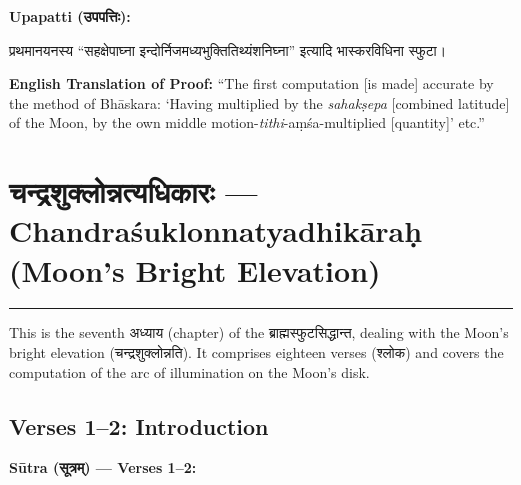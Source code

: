 \documentclass[11pt,a4paper]{article}
\newcommand{\dev}[1]{{\devanagarifont #1}}
\newenvironment{sanskritverse}{%
  \begin{center}\begin{minipage}{0.95\textwidth}
  \setlength{\leftskip}{1em}
  \setlength{\rightskip}{1em}
  \dev
}{\end{minipage}\end{center}}
\newenvironment{paracol}[1]{\begingroup}{\endgroup}
\newcommand{\switchcolumn}[1][]{%
  \ifnum#1=0\relax\else\par\nobreak\vspace{0.5em}\par\nobreak\fi%
}
\begin{document}
\vspace{0.5em}

\begin{paracol}{2}

\noindent\textbf{Upapatti (\dev{उपपत्तिः}):}
\begin{sanskritverse}
प्रथमानयनस्य ``सहक्षेपाघ्ना इन्दोर्निजमध्यभुक्तितिथ्यंशनिघ्ना'' इत्यादि
भास्करविधिना स्फुटा।
\end{sanskritverse}

\switchcolumn

\textbf{English Translation of Proof:} ``The first computation [is made] accurate by the method of Bhāskara: `Having multiplied by the \textit{sahakṣepa} [combined latitude] of the Moon, by the own middle motion-\textit{tithi}-aṃśa-multiplied [quantity]' etc.''

\end{paracol}

\newpage

\section{\texorpdfstring{{\devanagarifont चन्द्रशुक्लोन्नत्यधिकारः} — Chandraśuklonnatyadhikāraḥ (Moon's Bright Elevation)}{Chandraśuklonnatyadhikāraḥ (Moon's Bright Elevation)}}
\label{sec:chandra-shuklonnati}

\begin{center}
\textcolor{rulecolor}{\rule{0.8\textwidth}{0.5pt}}
\end{center}

This is the seventh \dev{अध्याय} (chapter) of the \dev{ब्राह्मस्फुटसिद्धान्त}, dealing with the Moon's bright elevation (\dev{चन्द्रशुक्लोन्नति}). It comprises eighteen verses (\dev{श्लोक}) and covers the computation of the arc of illumination on the Moon's disk.

\subsection{Verses 1--2: Introduction}

\vspace{0.5em}
\noindent\textbf{Sūtra (\dev{सूत्रम्}) — Verses 1--2:}
\end{document}
